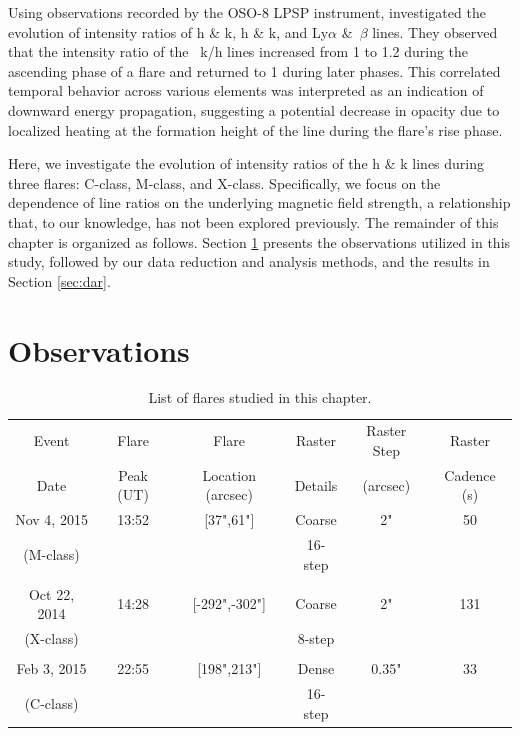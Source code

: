 Using observations recorded by the OSO-8 LPSP instrument, \citep{lemaire84} investigated the evolution of intensity ratios of   h \& k,  h \& k, and Ly$\alpha$ \&~$\beta$ lines. They observed that the intensity ratio of the ~k/h lines increased from 1 to 1.2 during the ascending phase of a flare and returned to 1 during later phases. This correlated temporal behavior across various elements was interpreted as an indication of downward energy propagation, suggesting a potential decrease in opacity due to localized heating at the formation height of the  line during the flare's rise phase.

Here, we investigate the evolution of intensity ratios of the   h \& k lines during three flares: C-class, M-class, and X-class. Specifically, we focus on the dependence of line ratios on the underlying magnetic field strength, a relationship that, to our knowledge, has not been explored previously. The remainder of this chapter is organized as follows. Section \ref{sec:obs} presents the observations utilized in this study, followed by our data reduction and analysis methods, and the results in Section \ref{sec:dar}.

\section{Observations} \label{sec:obs}
\begin{table}[ht!]
\centering
\begin{tabular}{|c|c|c|c|c|c|}
\hline
Event & Flare & Flare & Raster & Raster Step & Raster \\
Date & Peak (UT) & Location (arcsec) & Details & (arcsec) & Cadence (s)\\
\hline
Nov 4, 2015  & 13:52 & [37",61"] & Coarse & 2" & 50\\
(M-class) & & & 16-step  & & \\
 & & & & & \\
Oct 22, 2014 & 14:28 & [-292",-302"] & Coarse & 2" & 131\\
(X-class) & & & 8-step  & & \\
 & & & & & \\
Feb 3, 2015 & 22:55 & [198",213"] & Dense & 0.35" & 33\\
(C-class) & & & 16-step  & & \\
\hline
\end{tabular}%
\caption{List of flares studied in this chapter.}
\label{tab:my_label}
\end{table}

